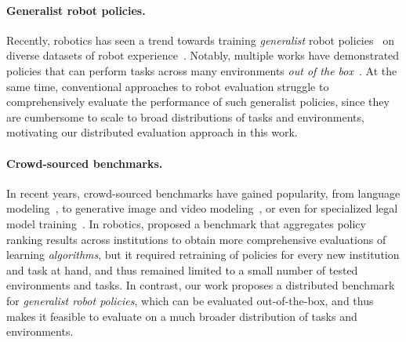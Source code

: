 \paragraph{Generalist robot policies.} 
Recently, robotics has seen a trend towards training \emph{generalist} robot policies~\citep{driess2023palm, rt22023arxiv, open_x_embodiment_rt_x_2023, octo_2023, Doshi24-crossformer, kim2024openvla, black2024pi_0, wen2024tinyvlafastdataefficientvisionlanguageaction, zhen20243dvla, belkhale2024minivla, szot2024multimodal, pertsch2025fast, geminirobotics2025, wen2025dexvla, bjorck2025gr00t} on diverse datasets of robot experience~\citep{dasari2019robonet, ebert2021bridge, walke2023bridgedata, open_x_embodiment_rt_x_2023, khazatsky2024droid, bharadhwaj2023roboagent, fang2024rh20t, shafiullah2023bringingrobotshome, contributors2025agibotworld}. Notably, multiple works have demonstrated policies that can perform tasks across many environments \emph{out of the box}~\citep{gupta2018robotlearninghomesimproving, chi2024universal, etukuru2024robotutilitymodelsgeneral, pertsch2025fast}. At the same time, conventional approaches to robot evaluation struggle to comprehensively evaluate the performance of such generalist policies, since they are cumbersome to scale to broad distributions of tasks and environments, motivating our distributed evaluation approach in this work.

\paragraph{Crowd-sourced benchmarks.} 
In recent years, crowd-sourced benchmarks have gained popularity, from language modeling~\citep{chiang2024chatbot}, to generative image and video modeling~\citep{jiang2024genai}, or even for specialized legal model training~\citep{guha2023legalbench}. In robotics, \citet{dasari2022rb2} proposed a benchmark that aggregates policy ranking results across institutions to obtain more comprehensive evaluations of learning \emph{algorithms}, but it required retraining of policies for every new institution and task at hand, and thus remained limited to a small number of tested environments and tasks. In contrast, our work proposes a distributed benchmark for \emph{generalist robot policies}, which can be evaluated out-of-the-box, and thus makes it feasible to evaluate on a much broader distribution of tasks and environments. %

